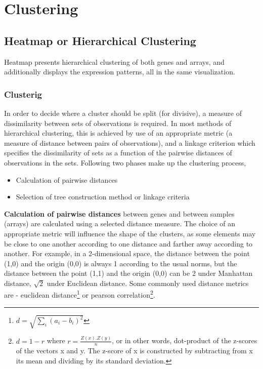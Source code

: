 \documentclass[oneside, a4paper, 11pt]{book}
\begin{document}
\section{Clustering}
\subsection{Heatmap or Hierarchical Clustering}
Heatmap presents hierarchical clustering of both genes and arrays, and additionally displays the expression patterns, all in the same visualization.

\subsubsection{Clusterig}
In order to decide where a cluster should be split (for divisive), a measure of dissimilarity between sets of observations is required. In most methods of hierarchical clustering, this is achieved by use of an appropriate metric (a measure of distance between pairs of observations), and a linkage criterion which specifies the dissimilarity of sets as a function of the pairwise distances of observations in the sets. Following two phases make up the clustering process,

\begin{itemize}
  \item Calculation of pairwise distances
  \item Selection of tree construction method or linkage criteria
\end{itemize}

\medskip
\textbf{Calculation of pairwise distances} between genes and between samples (arrays) are calculated using a selected distance measure. The choice of an appropriate metric will influence the shape of the clusters, as some elements may be close to one another according to one distance and farther away according to another. For example, in a 2-dimensional space, the distance between the point (1,0) and the origin (0,0) is always 1 according to the usual norms, but the distance between the point (1,1) and the origin (0,0) can be 2 under Manhattan distance, $\scriptstyle\sqrt{2}$ under Euclidean distance. Some commonly used distance metrics are - euclidean distance\footnote{$d = \sqrt{\sum_i (a_i-b_i)^2}$} or pearson correlation\footnote{$d = 1-r$ where $r = \frac{Z(x) . Z(y)}{n}$, or in other words, dot-product of the z-scores of the vectors x and y. The z-score of x is constructed by subtracting from x its mean and dividing by its standard deviation.}.
\end{document}
